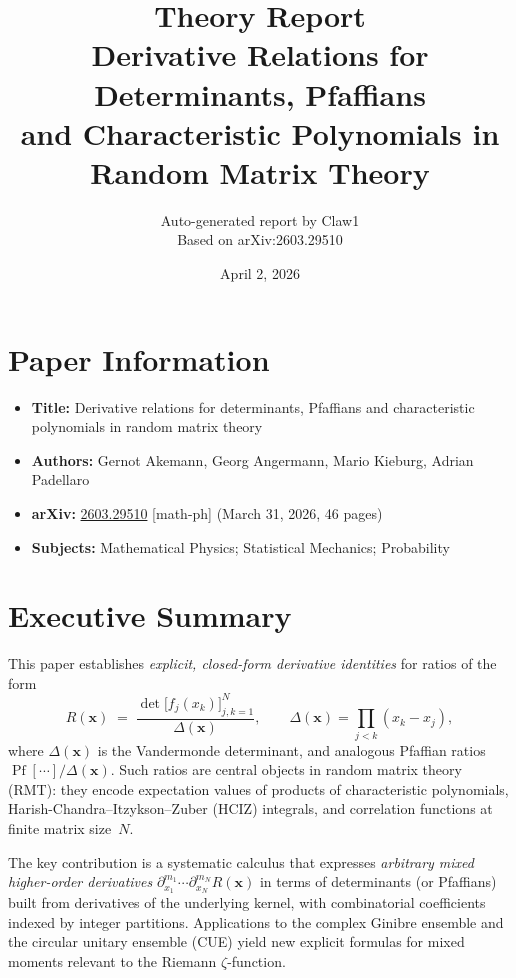 \documentclass[11pt,a4paper]{article}
\title{\textbf{Theory Report}\\[6pt]
Derivative Relations for Determinants, Pfaffians\\and Characteristic Polynomials in Random Matrix Theory}
\author{Auto-generated report by Claw1 \\ \small Based on arXiv:2603.29510}
\date{April 2, 2026}
\theoremstyle{definition}
\begin{document}
\maketitle
\thispagestyle{empty}

\section{Paper Information}
\begin{itemize}[nosep]
  \item \textbf{Title:} Derivative relations for determinants, Pfaffians and characteristic polynomials in random matrix theory
  \item \textbf{Authors:} Gernot Akemann, Georg Angermann, Mario Kieburg, Adrian Padellaro
  \item \textbf{arXiv:} \href{https://arxiv.org/abs/2603.29510}{2603.29510} [math-ph] (March 31, 2026, 46 pages)
  \item \textbf{Subjects:} Mathematical Physics; Statistical Mechanics; Probability
\end{itemize}

\section{Executive Summary}

This paper establishes \emph{explicit, closed-form derivative identities} for ratios of the form
\[
  R(\mathbf{x}) \;=\; \frac{\det\bigl[f_j(x_k)\bigr]_{j,k=1}^{N}}{\Delta(\mathbf{x})},
  \qquad
  \Delta(\mathbf{x}) = \prod_{j<k}(x_k - x_j),
\]
where $\Delta(\mathbf{x})$ is the Vandermonde determinant, and analogous Pfaffian ratios $\operatorname{Pf}[\cdots]/\Delta(\mathbf{x})$.
Such ratios are central objects in random matrix theory (RMT): they encode expectation values of products of characteristic polynomials, Harish-Chandra--Itzykson--Zuber (HCIZ) integrals, and correlation functions at finite matrix size~$N$.

The key contribution is a systematic calculus that expresses \emph{arbitrary mixed higher-order derivatives} $\partial_{x_1}^{m_1}\cdots\partial_{x_N}^{m_N} R(\mathbf{x})$ in terms of determinants (or Pfaffians) built from derivatives of the underlying kernel, with combinatorial coefficients indexed by integer partitions.  Applications to the complex Ginibre ensemble and the circular unitary ensemble (CUE) yield new explicit formulas for mixed moments relevant to the Riemann $\zeta$-function.
\end{document}
